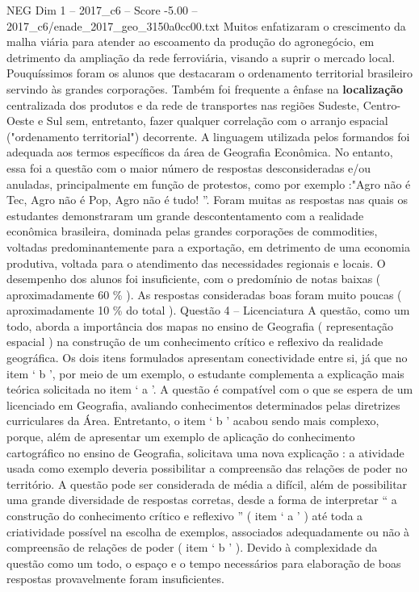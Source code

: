 \begin{textsample}{NEG Dim 1 – 2017\_c6 – Score -5.00 – 2017\_c6/enade\_2017\_geo\_3150a0cc00.txt}
Muitos enfatizaram o crescimento da malha viária para atender ao escoamento da produção do agronegócio, em detrimento da ampliação da rede ferroviária, visando a suprir o mercado local.
Pouquíssimos foram os alunos que destacaram o ordenamento territorial brasileiro servindo às grandes corporações.
Também foi frequente a ênfase na \textbf{localização} centralizada dos produtos e da rede de transportes nas regiões Sudeste, Centro-Oeste e Sul sem, entretanto, fazer qualquer correlação com o arranjo espacial ("ordenamento territorial") decorrente.
A linguagem utilizada pelos formandos foi adequada aos termos específicos da área de Geografia Econômica.
No entanto, essa foi a questão com o maior número de respostas desconsideradas e/ou anuladas, principalmente em função de protestos, como por exemplo :"Agro não é Tec, Agro não é Pop, Agro não é tudo! ”.
Foram muitas as respostas nas quais os estudantes demonstraram um grande descontentamento com a realidade econômica brasileira, dominada pelas grandes corporações de commodities, voltadas predominantemente para a exportação, em detrimento de uma economia produtiva, voltada para o atendimento das necessidades regionais e locais.
O desempenho dos alunos foi insuficiente, com o predomínio de notas baixas ( aproximadamente 60 \% ).
As respostas consideradas boas foram muito poucas ( aproximadamente 10 \% do total ).
Questão 4 – Licenciatura A questão, como um todo, aborda a importância dos mapas no ensino de Geografia ( representação espacial ) na construção de um conhecimento crítico e reflexivo da realidade geográfica.
Os dois itens formulados apresentam conectividade entre si, já que no item ‘ b ’, por meio de um exemplo, o estudante complementa a explicação mais teórica solicitada no item ‘ a ’.
A questão é compatível com o que se espera de um licenciado em Geografia, avaliando conhecimentos determinados pelas diretrizes curriculares da Área.
Entretanto, o item ‘ b ’ acabou sendo mais complexo, porque, além de apresentar um exemplo de aplicação do conhecimento cartográfico no ensino de Geografia, solicitava uma nova explicação : a atividade usada como exemplo deveria possibilitar a compreensão das relações de poder no território.
A questão pode ser considerada de média a difícil, além de possibilitar uma grande diversidade de respostas corretas, desde a forma de interpretar “ a construção do conhecimento crítico e reflexivo ” ( item ‘ a ’ ) até toda a criatividade possível na escolha de exemplos, associados adequadamente ou não à compreensão de relações de poder ( item ‘ b ’ ).
Devido à complexidade da questão como um todo, o espaço e o tempo necessários para elaboração de boas respostas provavelmente foram insuficientes.

\end{textsample}
